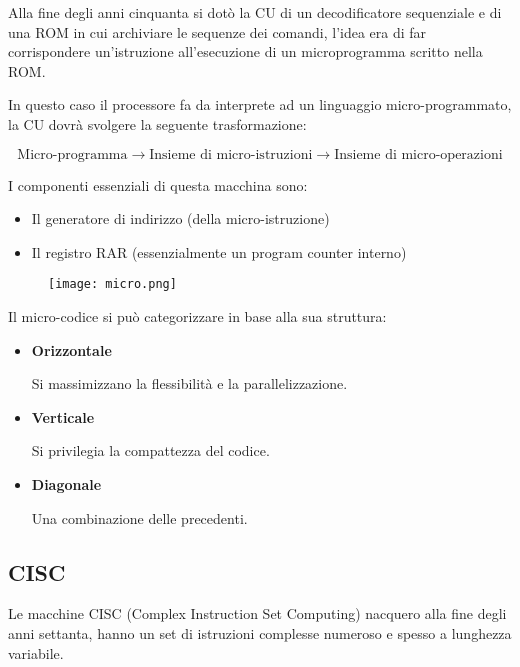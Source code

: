 \documentclass{article}
\begin{document}
Alla fine degli anni cinquanta si dotò la CU di un decodificatore sequenziale e di una ROM in cui archiviare le sequenze dei comandi, l'idea era di far corrispondere un'istruzione all'esecuzione di un microprogramma scritto nella ROM.\newline

\noindent In questo caso il processore fa da interprete ad un linguaggio micro-programmato, la CU dovrà svolgere la seguente trasformazione:

$$\text{Micro-programma}\rightarrow\text{Insieme di micro-istruzioni}\rightarrow\text{Insieme di micro-operazioni}$$\newline

\newpage

\noindent I componenti essenziali di questa macchina sono:
\begin{itemize}
    \item Il generatore di indirizzo (della micro-istruzione)
    \item Il registro RAR (essenzialmente un program counter interno)\newline
\end{itemize}

\begin{figure}[ht]
    \centering
    \texttt{[image: micro.png]}
    \label{fig:micro}
\end{figure}

\noindent Il micro-codice si può categorizzare in base alla sua struttura:
\begin{itemize}
    \item \textbf{Orizzontale}

        Si massimizzano la flessibilità e la parallelizzazione.

    \item \textbf{Verticale}

        Si privilegia la compattezza del codice.

    \item \textbf{Diagonale}

        Una combinazione delle precedenti.
    
\end{itemize}

\newpage

\subsection{CISC}
Le macchine CISC (Complex Instruction Set Computing) nacquero alla fine degli anni settanta, hanno un set di istruzioni complesse numeroso e spesso a lunghezza variabile.\newline
\end{document}
